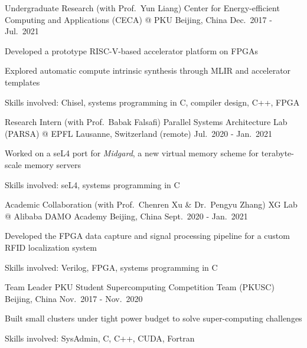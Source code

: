 \begin{cventries}
  \cventry
    {Undergraduate Research (with Prof.\ Yun Liang)} %
    {Center for Energy-efficient Computing and Applications (CECA) @ PKU} %
    {Beijing, China} %
    {Dec.\ 2017 - Jul.\ 2021} %
    {
        \begin{cvitems}
            \item {Developed a prototype RISC-V-based accelerator platform on
                FPGAs}
            \item {Explored automatic compute intrinsic synthesis through MLIR
                and accelerator templates}
            \item {Skills involved: Chisel, systems programming in C, compiler
                design, C++, FPGA}
        \end{cvitems}
    }

  \cventry
    {Research Intern (with Prof.\ Babak Falsafi)} %
    {Parallel Systems Architecture Lab (PARSA) @ EPFL} %
    {Lausanne, Switzerland (remote)} %
    {Jul.\ 2020 - Jan.\ 2021} %
    {
        \begin{cvitems}
            \item {Worked on a seL4 port for \emph{Midgard}, a new virtual
                memory scheme for terabyte-scale memory servers}
            \item {Skills involved: seL4, systems programming in C}
        \end{cvitems}
    }

  \cventry
    {Academic Collaboration (with Prof.\ Chenren Xu \& Dr.\ Pengyu Zhang)} %
    {XG Lab @ Alibaba DAMO Academy} %
    {Beijing, China} %
    {Sept.\ 2020 - Jan.\ 2021} %
    {
        \begin{cvitems}
            \item {Developed the FPGA data capture and signal processing
                pipeline for a custom RFID localization system}
            \item {Skills involved: Verilog, FPGA, systems programming in C}
        \end{cvitems}
    }

  \cventry
    {Team Leader} %
    {PKU Student Supercomputing Competition Team (PKUSC)} %
    {Beijing, China} %
    {Nov.\ 2017 - Nov.\ 2020} %
    {
        \begin{cvitems}
            \item {Built small clusters under tight power budget to solve
                super-computing challenges}
            \item {Skills involved: SysAdmin, C, C++, CUDA, Fortran}
        \end{cvitems}
    }

\end{cventries}

